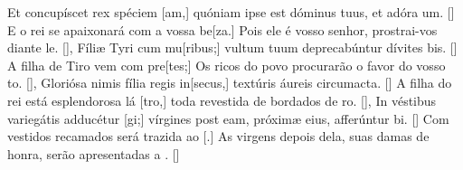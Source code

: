 {  %
  {Et concupíscet rex spéciem [am,] quóniam ipse est dóminus tuus, et adóra um. [\LinkLA]}%
    {E o rei se apaixonará com a vossa be[za.] Pois ele é vosso senhor, prostrai-vos diante le. [\LinkPT]},
  {Fíliæ Tyri cum mu[ribus;] vultum tuum deprecabúntur dívites bis. [\LinkLA]}%
    {A filha de Tiro vem com pre[tes;] Os ricos do povo procurarão o favor do vosso to. [\LinkPT]},
  {Gloriósa nimis fília regis in[secus,] textúris áureis circumacta. [\LinkLA]}%
    {A filha do rei está esplendorosa lá [tro,] toda revestida de bordados de ro. [\LinkPT]},
  {In véstibus variegátis adducétur [gi;] vírgines post eam, próximæ eius, afferúntur bi. [\LinkLA]}%
    {Com vestidos recamados será trazida ao [.] As virgens depois dela, suas damas de honra, serão apresentadas a . [\LinkPT]}
}